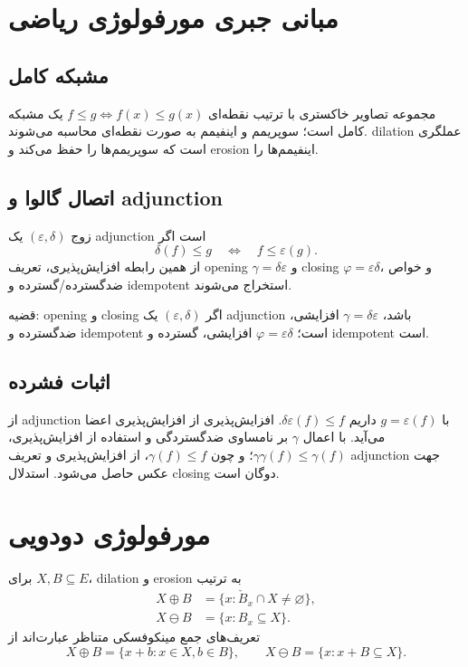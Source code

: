 \documentclass[12pt,openany,oneside]{book}
\begin{document}
\section{مبانی جبری مورفولوژی ریاضی}
\subsection{مشبکه کامل}
مجموعه تصاویر خاکستری با ترتیب نقطه‌ای \(f\le g\iff f(x)\le g(x)\) یک مشبکه کامل است؛ سوپریمم و اینفیمم
به صورت نقطه‌ای محاسبه می‌شوند. dilation عملگری است که سوپریمم‌ها را حفظ می‌کند و erosion اینفیمم‌ها را.

\subsection{اتصال گالوا و adjunction}
زوج \((\varepsilon,\delta)\) یک adjunction است اگر
\begin{equation}
\delta(f)\le g\quad\Longleftrightarrow\quad f\le\varepsilon(g).
\end{equation}
از همین رابطه افزایش‌پذیری، تعریف opening \(\gamma=\delta\varepsilon\) و closing
\(\varphi=\varepsilon\delta\)، و خواص ضدگسترده/گسترده و idempotent استخراج می‌شوند.

\begin{theorembox}{قضیه: opening و closing}
اگر \((\varepsilon,\delta)\) یک adjunction باشد، \(\gamma=\delta\varepsilon\) افزایشی، ضدگسترده و idempotent
است؛ \(\varphi=\varepsilon\delta\) افزایشی، گسترده و idempotent است.
\end{theorembox}

\subsection{اثبات فشرده}
از adjunction با \(g=\varepsilon(f)\) داریم \(\delta\varepsilon(f)\le f\). افزایش‌پذیری از افزایش‌پذیری اعضا
می‌آید. با اعمال \(\gamma\) بر نامساوی ضدگستردگی و استفاده از افزایش‌پذیری،
\(\gamma\gamma(f)\le\gamma(f)\)؛ و چون \(\gamma(f)\le f\)، از افزایش‌پذیری و تعریف adjunction جهت عکس حاصل
می‌شود. استدلال closing دوگان است.

\section{مورفولوژی دودویی}
برای \(X,B\subseteq E\)، dilation و erosion به ترتیب
\begin{align}
X\oplus B&=\{x:\check B_x\cap X\neq\varnothing\},\\
X\ominus B&=\{x:B_x\subseteq X\}.
\end{align}
تعریف‌های جمع مینکوفسکی متناظر عبارت‌اند از
\begin{equation}
X\oplus B=\{x+b:x\in X,b\in B\},\qquad
X\ominus B=\{x:x+B\subseteq X\}.
\end{equation}
\end{document}
